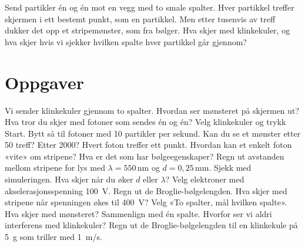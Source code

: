 \documentclass[11pt]{article}
\begin{document}

Send partikler én og én mot en vegg med to smale spalter. Hver partikkel treffer skjermen i ett bestemt punkt, som en partikkel. Men etter tusenvis av treff dukker det opp et stripemønster, som fra bølger. Hva skjer med klinkekuler, og hva skjer hvis vi sjekker hvilken spalte hver partikkel går gjennom?

\section*{Oppgaver}

\begin{oppgaveliste}
\oppgave {}Vi sender klinkekuler gjennom to spalter. Hvordan ser mønsteret på skjermen ut? Hva tror du skjer med fotoner som sendes én og én?
\svar
\oppgave {}Velg klinkekuler og trykk Start. Bytt så til fotoner med 10 partikler per sekund. Kan du se et mønster etter 50 treff? Etter 2000?
\svar
\oppgave {}Hvert foton treffer ett punkt. Hvordan kan et enkelt foton «vite» om stripene? Hva er det som har bølgeegenskaper?
\svar
\oppgave {}Regn ut avstanden mellom stripene for lys med $λ = 550\,\mathrm{nm}$ og $d = 0{,}25\,\mathrm{mm}$. Sjekk med simuleringen. Hva skjer når du øker $d$ eller $λ$?
\svar
\oppgave {}Velg elektroner med akselerasjonsspenning 100~V. Regn ut de Broglie-bølgelengden. Hva skjer med stripene når spenningen økes til 400~V?
\svar
\oppgave {}Velg «To spalter, mål hvilken spalte». Hva skjer med mønsteret? Sammenlign med én spalte.
\svar
\oppgave {}Hvorfor ser vi aldri interferens med klinkekuler? Regn ut de Broglie-bølgelengden til en klinkekule på 5~g som triller med 1~m/s.
\svar
\end{oppgaveliste}
\end{document}
